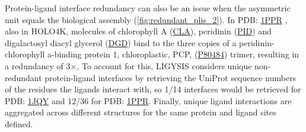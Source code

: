 Protein-ligand interface redundancy can also be an issue when the asymmetric unit equals the biological assembly (\autoref{fig:redundant_plis_2}). In PDB: \href{https://www.ebi.ac.uk/pdbe/entry/pdb/1PPR}{1PPR} \cite{HOFMANN_1996_CAROTENOID}, also in HOLO4K, molecules of chlorophyll A (\href{https://www.ebi.ac.uk/pdbe-srv/pdbechem/chemicalCompound/show/CLA}{CLA}), peridinin (\href{https://www.ebi.ac.uk/pdbe-srv/pdbechem/chemicalCompound/show/PID}{PID}) and digalactosyl diacyl glycerol (\href{https://www.ebi.ac.uk/pdbe-srv/pdbechem/chemicalCompound/show/DGD}{DGD}) bind to the three copies of a peridinin-chlorophyll a-binding protein 1, chloroplastic, PCP, (\href{https://www.uniprot.org/uniprotkb/P80484/entry}{P80484}) trimer, resulting in a redundancy of 3$\times$. To account for this, LIGYSIS considers unique non-redundant protein-ligand interfaces by retrieving the UniProt sequence numbers of the residues the ligands interact with, so 1/14 interfaces would be retrieved for PDB: \href{https://www.ebi.ac.uk/pdbe/entry/pdb/1JQY}{1JQY} and 12/36 for PDB: \href{https://www.ebi.ac.uk/pdbe/entry/pdb/1PPR}{1PPR}. Finally, unique ligand interactions are aggregated across different structures for the same protein and ligand sites defined.

\FloatBarrier



